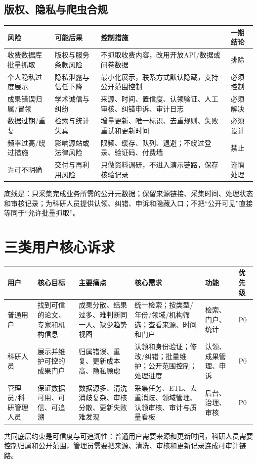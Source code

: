 \documentclass[UTF8,11pt,a4paper]{ctexart}
\begin{document}
\subsection{版权、隐私与爬虫合规}
\begin{longtable}{p{3.2cm}p{4.0cm}p{5.0cm}p{2.2cm}}
\toprule 风险 & 可能后果 & 控制措施 & 一期结论\\\midrule
收费数据库批量抓取 & 版权与服务条款风险 & 不抓取收费内容，改用开放API/数据或问卷数据 & 排除\\
个人隐私过度展示 & 隐私泄露与信任下降 & 最小化展示，联系方式默认隐藏，支持公开范围控制 & 必须控制\\
成果错误归属/冒领 & 学术诚信与纠纷 & 来源、时间、置信度、认领验证、人工审核、纠错申诉、审计日志 & 必须解决\\
数据过期/重复 & 检索与统计失真 & 增量更新、唯一标识、去重规则、失败重试和更新时间 & 必须设计\\
频率过高/绕过措施 & 影响源站或法律风险 & 限频、缓存、队列、退避；不绕过登录、验证码、付费墙 & 禁止\\
许可不明确 & 交付与再利用风险 & 只做资料调研，不进入演示链路，保存核验记录 & 谨慎处理\\\bottomrule
\end{longtable}

底线是：只采集完成业务所需的公开元数据；保留来源链接、采集时间、处理状态和审核记录；为科研人员提供认领、纠错、申诉和隐藏入口；不把“公开可见”直接等同于“允许批量抓取”。

\section{三类用户核心诉求}
\begin{longtable}{p{2.1cm}p{3.0cm}p{3.0cm}p{3.6cm}p{2.0cm}p{2.1cm}}
\toprule 用户 & 核心目标 & 主要痛点 & 核心需求 & 功能 & 优先级\\\midrule
普通用户 & 找到可信的论文、专家和机构信息 & 成果分散、结果过多、难判断同一人、缺少趋势视图 & 统一检索；按类型/年份/领域/机构筛选；查看来源、时间和门户 & 检索、门户、统计 & P0\\
科研人员 & 展示并维护可控的成果门户 & 归属错误、重复、更新成本高、隐私顾虑 & 认领和身份验证；修改/纠错；批量维护；公开范围控制；处理进度 & 认领、成果管理、申诉 & P0\\
管理员/科研管理人员 & 保证数据可用、可信、可追溯 & 数据源多、清洗消歧复杂、审核分散、更新失败难发现 & 采集任务、ETL、去重消歧、领域管理、认领审核、审计与质量看板 & 后台、治理、审核 & P0\\\bottomrule
\end{longtable}
共同底层约束是可信度与可追溯性：普通用户需要来源和更新时间，科研人员需要控制归属和公开范围，管理员需要把来源、清洗、审核和更新记录连成可审计链路。
\end{document}
